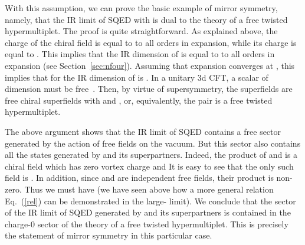 \documentclass[a4paper,12pt, amsfonts, amssymb]{article}
\begin{document}
With this assumption, we can prove the basic example of \coordHE{} mirror
symmetry, namely, that the IR limit of \coordHE{} SQED with \coordHE{} is
dual to the theory of a free twisted hypermultiplet. The proof is quite
straightforward. As explained above, the \coordHE{} charge
of the chiral field \coordHE{} is equal to \coordHE{} to all orders in 
\coordHE{} expansion, while its \coordHE{} charge is equal to \coordHE{}.
This implies that the IR dimension of \coordHE{} is equal to \coordHE{} to 
all orders in \coordHE{} expansion (see Section~\ref{sec:nfour}). 
Assuming that \coordHE{} expansion converges at \coordHE{}, this implies
that for \coordHE{} the IR dimension of \coordHE{} is \coordHE{}. In a unitary 3d CFT,
a scalar of dimension \coordHE{} must be free~\cite{Minwalla}. Then, by virtue
of supersymmetry, the \coordHE{} superfields \coordHE{}
are free chiral superfields with \coordHE{} and \coordHE{}, or, equivalently,
the pair \coordHE{} is a free twisted hypermultiplet.

The above argument shows that the IR limit of \coordHE{} SQED contains a free
sector generated by the action of free fields \coordHE{} on the vacuum.
But this sector also contains all the states generated by \myHighlight{$\Phi$}\coordHE{} and its superpartners. Indeed, the product of \coordHE{} and \coordHE{} is a chiral field
which has zero vortex charge and \coordHE{} It is easy to see that
the only such field is \myHighlight{$\Phi$}\coordHE{}. In addition, since \coordHE{} and \coordHE{} are
independent free fields, their product is non-zero. Thus we must
have \coordHE{} (we have seen above how a more general relation 
Eq.~(\ref{rel}) can be demonstrated in the large-\coordHE{} limit). 
We conclude that the sector of the IR limit of \coordHE{} SQED generated by 
\myHighlight{$\Phi$}\coordHE{} and its superpartners is contained in the charge-0 sector of the 
theory of a free twisted hypermultiplet. This is precisely the statement of
mirror symmetry in this particular case.
 
\end{document}
